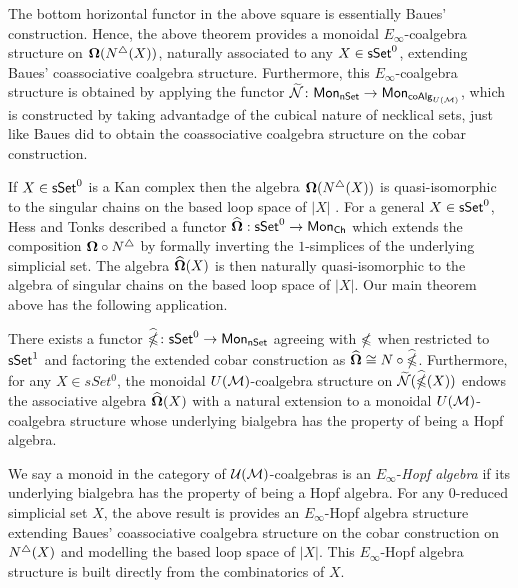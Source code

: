 The bottom horizontal functor in the above square is essentially Baues' construction. Hence, the above theorem provides a monoidal $E_{\infty}$-coalgebra structure on $\mathbf{\Omega}(N^{\triangle} (X))$, naturally associated to any $X \in \mathsf{sSet}^0$, extending Baues' coassociative coalgebra structure. Furthermore, this $E_{\infty}$-coalgebra structure is obtained by applying the functor $\widetilde{\mathcal{N}} \colon \mathsf{Mon}_{\mathsf{nSet}} \to \mathsf{Mon}_{\mathsf{coAlg}_{U(\mathcal{M})}}$, which is constructed by taking advantadge of the cubical nature of necklical sets, just like Baues did to obtain the coassociative coalgebra structure on the cobar construction. 

If $X \in \mathsf{sSet}^0$ is a Kan complex then the algebra $\mathbf{\Omega}(N^{\triangle}(X))$ is quasi-isomorphic to the singular chains on the based loop space of $|X|$ \cite{Rivera-Zeinalian}. For a general $X \in \mathsf{sSet}^0$, Hess and Tonks described a functor $\widehat{\mathbf{\Omega}}: \mathsf{sSet}^0 \to \mathsf{Mon}_{\mathsf{Ch}}$ which extends the composition $\mathbf{\Omega} \circ N^{\triangle}$ by formally inverting the $1$-simplices of the underlying simplicial set. The algebra $\widehat{\mathbf{\Omega}}(X)$ is then naturally quasi-isomorphic to the algebra of singular chains on the based loop space of $|X|$. Our main theorem above has the following application. 


\begin{theorem}
There exists a functor $\widehat{\mathbb{\Omega}} \colon \mathsf{sSet}^0 \to \mathsf{Mon}_{\mathsf{nSet}}$ agreeing with $\mathbb{\Omega}$ when restricted to $\mathsf{sSet}^1$ and factoring the extended cobar construction as $\widehat{\mathbf{\Omega}} \cong N \circ \widehat{\mathbb{\Omega}}$. Furthermore, for any $X \in sSet^0$, the monoidal $U(\mathcal{M})$-coalgebra structure on $\widetilde{\mathcal{N}}(\widehat{\mathbb{\Omega}}(X))$ endows the associative algebra $\widehat{\mathbf{\Omega}}(X)$ with a natural extension to a monoidal $U(\mathcal{M})$-coalgebra structure whose underlying bialgebra has the property of being a Hopf algebra.
\end{theorem}

We say a monoid in the category of $\mathcal{U(\mathcal{M})}$-coalgebras is an $E_{\infty}$-\textit{Hopf algebra} if its underlying bialgebra has the property of being a Hopf algebra. For any $0$-reduced simplicial set $X$, the above result is provides an $E_{\infty}$-Hopf algebra structure extending Baues' coassociative coalgebra structure on the cobar construction on $N^{\triangle}(X)$ and modelling the based loop space of $|X|$. This $E_{\infty}$-Hopf algebra structure is built directly from the combinatorics of $X$. 


